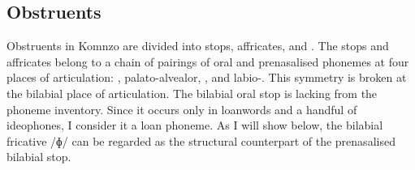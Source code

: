 \begin{table}
\caption[Consonant phoneme inventory]{Consonant phoneme inventory}
\label{consinv}
\end{table} %

\subsection{Obstruents} \label{obstruents}

Obstruents in Komnzo are divided into stops, affricates, and . The stops and affricates belong to a chain of pairings of oral and prenasalised phonemes at four places of articulation: , palato-alvealor, , and labio-. This symmetry is broken at the bilabial place of articulation. The bilabial oral stop is lacking from the phoneme inventory. Since it occurs only in  loanwords and a handful of ideophones, I consider it a loan phoneme. As I will show below, the bilabial fricative /ɸ/ can be regarded as the structural counterpart of the prenasalised bilabial stop.

